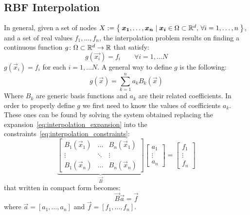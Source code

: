 \subsection{RBF Interpolation}
In general, given a set of nodes $X := \Set{\boldsymbol{x_1}, \dots,  \boldsymbol{x_n} \mid \boldsymbol{x_i} \in \Omega\subset\mathbb{R}^{d},\, \forall i=1, \dots, n}$, and a set of real values $f_1, \dots, f_n$, the interpolation problem results on finding a continuous function $g \colon \Omega\subset\mathbb{R}^{d} \to \mathbb{R}$ that satisfy:
\begin{equation}
	\label{eq:interpolation_constraints}
	g(\vec{x_i})=f_i \qquad \forall i=1, \dots N
\end{equation}
$g(\vec{x}_i)=f_i$ for each $i=1, \dots N$.
A general way to define $g$ is the following:
\begin{equation}
	\label{eq:interpolation_expansion}
	g(\vec{x}) = \sum_{k=1}^{n} a_k B_k(\vec{x})
\end{equation}
Where $B_k$ are generic basis functions and $a_k$ are their related coefficients. In order to properly define $g$ we first need to know the values of coefficients $a_k$. These ones can be found by solving the system obtained replacing the expansion~\eqref{eq:interpolation_expansion} into the constraints~\eqref{eq:interpolation_constraints}:
\begin{equation}
	\underbrace{\begin{bmatrix}
			B_1(\vec{x}_1) & \dots	   & B_n(\vec{x}_1) \\
			\vdots					& \ddots & \vdots					\\
			B_1(\vec{x}_n) & \dots	  & B_n(\vec{x}_n)
	\end{bmatrix}}_{\vec{B}}
	\begin{bmatrix}
		a_1 \\
		\vdots		 \\
		a_n
	\end{bmatrix}
	=
	\begin{bmatrix}
		f_1			\\
		\vdots \\
		f_n
	\end{bmatrix}
\end{equation}
that written in compact form becomes:
\begin{equation}
	\vec{B} \vec{a} = \vec{f}
\end{equation}
where $\vec{a} = [a_1, \dots, a_n]$ and $\vec{f} = [f_1, \dots, f_n]$.

